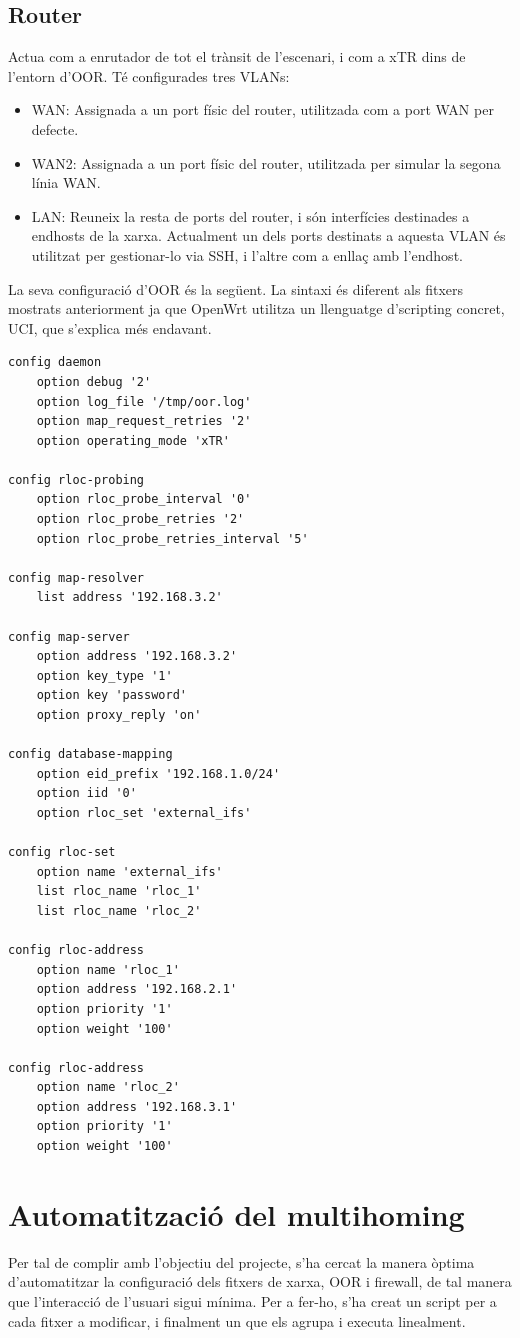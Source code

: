 \documentclass[11pt]{article}
\begin{document}
\subsection{Router}
Actua com a enrutador de tot el trànsit de l’escenari, i com a xTR dins de l’entorn d’OOR. Té configurades tres VLANs:
\begin{itemize}
\item WAN: Assignada a un port físic del router, utilitzada com a port WAN per defecte.
\item WAN2: Assignada a un port físic del router, utilitzada per simular la segona línia WAN.
\item LAN: Reuneix la resta de ports del router, i són interfícies destinades a endhosts de la xarxa. Actualment un dels ports destinats a aquesta VLAN és utilitzat per gestionar-lo via SSH, i l’altre com a enllaç amb l’endhost.
\end{itemize}
La seva configuració d’OOR és la següent. La sintaxi és diferent als fitxers mostrats anteriorment ja que OpenWrt utilitza un llenguatge d’scripting concret, UCI, que s’explica més endavant.\\
\lstset{language=sh}
\begin{lstlisting}[frame=single]
config daemon
    option debug '2'
    option log_file '/tmp/oor.log'
    option map_request_retries '2'
    option operating_mode 'xTR'

config rloc-probing
    option rloc_probe_interval '0'
    option rloc_probe_retries '2'
    option rloc_probe_retries_interval '5'

config map-resolver
    list address '192.168.3.2'

config map-server
    option address '192.168.3.2'
    option key_type '1'
    option key 'password'
    option proxy_reply 'on'

config database-mapping
    option eid_prefix '192.168.1.0/24'
    option iid '0'
    option rloc_set 'external_ifs'

config rloc-set
    option name 'external_ifs'
    list rloc_name 'rloc_1'
    list rloc_name 'rloc_2'

config rloc-address
    option name 'rloc_1'
    option address '192.168.2.1'
    option priority '1'
    option weight '100'

config rloc-address
    option name 'rloc_2'
    option address '192.168.3.1'
    option priority '1'
    option weight '100'
\end{lstlisting}

\section{Automatització del multihoming}
Per tal de complir amb l’objectiu del projecte, s’ha cercat la manera òptima d’automatitzar la configuració dels fitxers de xarxa, OOR i firewall, de tal manera que l’interacció de l’usuari sigui mínima. Per a fer-ho, s’ha creat un script per a cada fitxer a modificar, i finalment un que els agrupa i executa linealment. 
\end{document}
